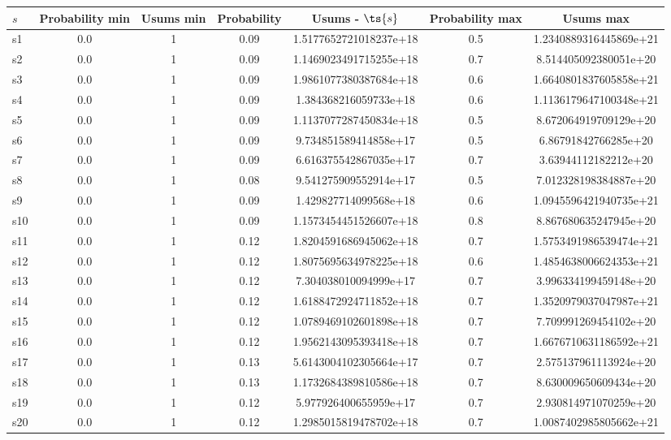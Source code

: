 \documentclass{article}
\begin{document}
\noindent\begin{tabular}{|l|c|c|c|c|c|c|}
\hline
$s$& Probability min & Usums min & Probability & Usums - $\ts{s}$ & Probability max & Usums max\\
\hline
s1 &0.0 & 1 & 0.09 & 1.5177652721018237e+18 & 0.5 & 1.2340889316445869e+21\\
\hline
s2 &0.0 & 1 & 0.09 & 1.1469023491715255e+18 & 0.7 & 8.514405092380051e+20\\
\hline
s3 &0.0 & 1 & 0.09 & 1.9861077380387684e+18 & 0.6 & 1.6640801837605858e+21\\
\hline
s4 &0.0 & 1 & 0.09 & 1.384368216059733e+18 & 0.6 & 1.1136179647100348e+21\\
\hline
s5 &0.0 & 1 & 0.09 & 1.1137077287450834e+18 & 0.5 & 8.672064919709129e+20\\
\hline
s6 &0.0 & 1 & 0.09 & 9.734851589414858e+17 & 0.5 & 6.86791842766285e+20\\
\hline
s7 &0.0 & 1 & 0.09 & 6.616375542867035e+17 & 0.7 & 3.63944112182212e+20\\
\hline
s8 &0.0 & 1 & 0.08 & 9.541275909552914e+17 & 0.5 & 7.012328198384887e+20\\
\hline
s9 &0.0 & 1 & 0.09 & 1.429827714099568e+18 & 0.6 & 1.0945596421940735e+21\\
\hline
s10 &0.0 & 1 & 0.09 & 1.1573454451526607e+18 & 0.8 & 8.867680635247945e+20\\
\hline
s11 &0.0 & 1 & 0.12 & 1.8204591686945062e+18 & 0.7 & 1.5753491986539474e+21\\
\hline
s12 &0.0 & 1 & 0.12 & 1.8075695634978225e+18 & 0.6 & 1.4854638006624353e+21\\
\hline
s13 &0.0 & 1 & 0.12 & 7.304038010094999e+17 & 0.7 & 3.996334199459148e+20\\
\hline
s14 &0.0 & 1 & 0.12 & 1.6188472924711852e+18 & 0.7 & 1.3520979037047987e+21\\
\hline
s15 &0.0 & 1 & 0.12 & 1.0789469102601898e+18 & 0.7 & 7.709991269454102e+20\\
\hline
s16 &0.0 & 1 & 0.12 & 1.9562143095393418e+18 & 0.7 & 1.6676710631186592e+21\\
\hline
s17 &0.0 & 1 & 0.13 & 5.6143004102305664e+17 & 0.7 & 2.575137961113924e+20\\
\hline
s18 &0.0 & 1 & 0.13 & 1.1732684389810586e+18 & 0.7 & 8.630009650609434e+20\\
\hline
s19 &0.0 & 1 & 0.12 & 5.977926400655959e+17 & 0.7 & 2.930814971070259e+20\\
\hline
s20 &0.0 & 1 & 0.12 & 1.2985015819478702e+18 & 0.7 & 1.0087402985805662e+21\\

\end{tabular}
\end{document}
